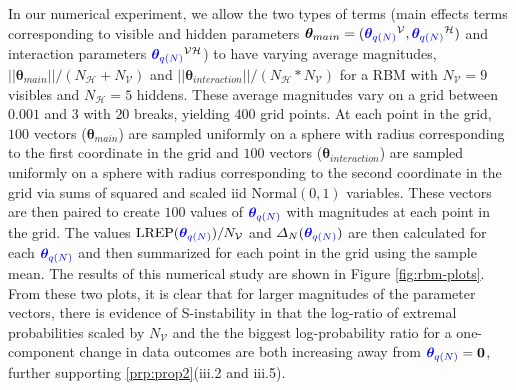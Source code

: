 \documentclass[numbib]{imamat}
\theoremstyle{theorem}
\theoremstyle{lemma}
\theoremstyle{example}
\theoremstyle{corollary}
\theoremstyle{definition}
\theoremstyle{remark}
\theoremstyle{approximation}
\theoremstyle{scheme}
\newcommand{\REP}{\mathrm{LREP}}
\newcommand{\DN}{\Delta_N}
\newcommand{\thetaidx}{q(N)}
\newcommand{\thetaN}{\boldsymbol \theta_{\thetaidx}}
\newcommand{\ak}[1]{{\color{blue} #1}}
\begin{document}
In our numerical experiment, we allow the two types of terms (main effects terms corresponding to visible and hidden parameters \(\boldsymbol \theta_{main} = (\ak{\thetaN}^{\mathcal{V}}, \ak{\thetaN}^{\mathcal{H}})\) and interaction parameters \(\ak{\thetaN}^{\mathcal{VH}}\)) to have varying average magnitudes, \(||\boldsymbol \theta_{main} || /(N_{\mathcal{H}}+N_{\mathcal{V}})\) and \(||\boldsymbol \theta_{interaction} || /(N_{\mathcal{H}}*N_{\mathcal{V}})\) for a RBM with \(N_\mathcal{V} = 9\) visibles and \(N_\mathcal{H} = 5\) hiddens. These average magnitudes vary on a grid between \(0.001\) and \(3\) with \(20\) breaks, yielding \(400\) grid points. At each point in the grid, \(100\) vectors (\(\boldsymbol \theta_{main}\)) are sampled uniformly on a sphere with radius corresponding to the first coordinate in the grid and \(100\) vectors (\(\boldsymbol \theta_{interaction}\)) are sampled uniformly on a sphere with radius corresponding to the second coordinate in the grid via sums of squared and scaled iid Normal\((0, 1)\) variables. These vectors are then paired to create \(100\) values of \(\ak{\thetaN}\) with magnitudes at each point in the grid. The values \(\REP(\ak{\thetaN})/N_{\mathcal{V}}\) and \(\DN(\ak{\thetaN})\) are then calculated for each \(\ak{\thetaN}\) and then summarized for each point in the grid using the sample mean. The results of this numerical study are shown in Figure \ref{fig:rbm-plots}. From these two plots, it is clear that for larger magnitudes of the parameter vectors, there is evidence of S-instability in that the log-ratio of extremal probabilities scaled by \(N_{\mathcal{V}}\) and the the biggest log-probability ratio for a one-component change in data outcomes are both increasing away from \(\ak{\thetaN} = \boldsymbol 0\), further supporting \ref{prp:prop2}(iii.2 and iii.5).

\par
\end{document}
